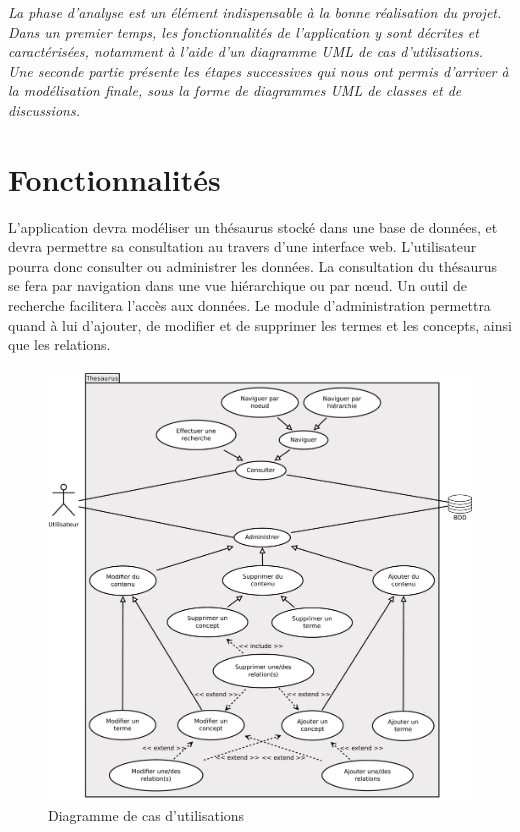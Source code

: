 \textit{La phase d'analyse est un élément indispensable à la bonne réalisation du projet. Dans un premier temps, les fonctionnalités de l'application y sont décrites et caractérisées, notamment à l'aide d'un diagramme UML de cas d'utilisations. Une seconde partie présente les étapes successives qui nous ont permis d'arriver à la modélisation finale, sous la forme de diagrammes UML de classes et de \og{}discussions\fg{}.}

\section{Fonctionnalités}

L'application devra modéliser un thésaurus stocké dans une base de données, et devra permettre sa consultation au travers d'une interface web. L'utilisateur pourra donc consulter ou administrer les données. La consultation du thésaurus se fera par navigation dans une vue hiérarchique ou par nœud. Un outil de recherche facilitera l'accès aux données. Le module d'administration permettra quand à lui d'ajouter, de modifier et de supprimer les termes et les concepts, ainsi que les relations.

\begin{figure}[H]
\begin{center}
\includegraphics[width=\textwidth]{files/usecase}
\end{center}
\caption{Diagramme de cas d'utilisations}
\end{figure}

